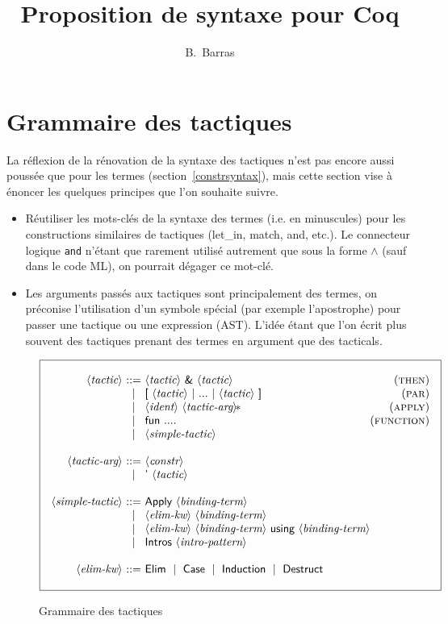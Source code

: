 \documentclass{article}
\author{B.~Barras}
\title{Proposition de syntaxe pour Coq}
\makeatletter
\def\NT#1{\langle\textit{#1}\rangle}
\def\TERM#1{\textsf{#1}}
\def\STAR#1{#1\!*}
\newenvironment{cadre}
        {\begin{array}{|c|}\hline\\}
        {\\\\\hline\end{array}}
\newenvironment{rulebox}
        {$$\begin{cadre}\begin{array}{r@{~}c@{~}l@{}r}}
        {\end{array}\end{cadre}$$}
\def\DEFNT#1{\NT{#1} & ::= &}
\def\RNAME#1{(\textsc{#1})}
\def\SEPDEF{\\\\}
\def\nlsep{\\&|&}
\makeatother
\begin{document}
\maketitle

\section{Grammaire des tactiques}
\label{tacticsyntax}

La réflexion de la rénovation de la syntaxe des tactiques n'est pas
encore aussi poussée que pour les termes (section~\ref{constrsyntax}),
mais cette section vise à énoncer les quelques principes que l'on
souhaite suivre. 

\begin{itemize}
\item Réutiliser les mots-clés de la syntaxe des termes (i.e. en
  minuscules) pour les constructions similaires de tactiques (let_in,
  match, and, etc.). Le connecteur logique \texttt{and} n'étant que
  rarement utilisé autrement que sous la forme \texttt{$\wedge$} (sauf
  dans le code ML), on pourrait dégager ce mot-clé.
\item Les arguments passés aux tactiques sont principalement des
  termes, on préconise l'utilisation d'un symbole spécial (par exemple
  l'apostrophe) pour passer une tactique ou une expression
  (AST). L'idée étant que l'on écrit plus souvent des tactiques
  prenant des termes en argument que des tacticals.
\end{itemize}

\begin{figure}
\begin{rulebox}
\DEFNT{tactic}
       \NT{tactic} ~\TERM{\&} ~\NT{tactic}            & \RNAME{then}
\nlsep \TERM{[} ~\NT{tactic}~\TERM{|}~...
      ~\TERM{|}~\NT{tactic}~\TERM{]}                  & \RNAME{par}
\nlsep \NT{ident} ~\STAR{\NT{tactic-arg}}   ~~~       & \RNAME{apply}
\nlsep \TERM{fun} ~....                               & \RNAME{function}
\nlsep \NT{simple-tactic}
\SEPDEF
\DEFNT{tactic-arg}
       \NT{constr}
\nlsep \TERM{'} ~\NT{tactic}
\SEPDEF
\DEFNT{simple-tactic}
       \TERM{Apply} ~\NT{binding-term}
\nlsep \NT{elim-kw} ~\NT{binding-term}
\nlsep \NT{elim-kw} ~\NT{binding-term} ~\TERM{using} ~\NT{binding-term}
\nlsep \TERM{Intros} ~\NT{intro-pattern}
\SEPDEF
\DEFNT{elim-kw}
       \TERM{Elim} ~\mid~ \TERM{Case} ~\mid~ \TERM{Induction}
       ~\mid~ \TERM{Destruct}
\end{rulebox}
\caption{Grammaire des tactiques}
\label{tactic}
\end{figure}
\end{document}
